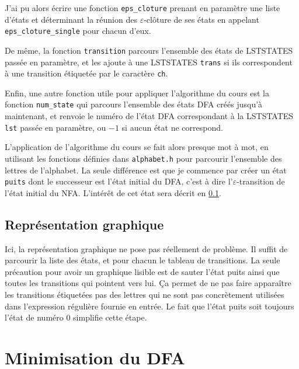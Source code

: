 \documentclass[12pt, a4paper]{article}
\begin{document}
J'ai pu alors écrire une fonction \texttt{eps\_cloture} prenant en paramètre une liste d'états et déterminant la réunion des $\varepsilon$-clôture de ses états en appelant \texttt{eps\_cloture\_single} pour chacun d'eux.

De même, la fonction \texttt{transition} parcours l'ensemble des états de LSTSTATES passée en paramètre, et les ajoute à une LSTSTATES \texttt{trans} si ils correspondent à une transition étiquetée par le caractère \texttt{ch}.

Enfin, une autre fonction utile pour appliquer l'algorithme du cours est la fonction \texttt{num\_state} qui parcours l'ensemble des états DFA créés jusqu'à maintenant, et renvoie le numéro de l'état DFA correspondant à la LSTSTATES \texttt{lst} passée en paramètre, ou $-1$ si aucun état ne correspond. 

L'application de l'algorithme du cours se fait alors presque mot à mot, en utilisant les fonctions définies dans \texttt{alphabet.h} pour parcourir l'ensemble des lettres de l'alphabet. La seule différence est que je commence par créer un état \texttt{puits} dont le successeur est l'état initial du DFA, c'est à dire l'$\varepsilon$-transition de l'état initial du NFA. L'intérêt de cet état sera décrit en \ref{dfa_graph}.


\subsection{Représentation graphique}
\label{dfa_graph}

Ici, la représentation graphique ne pose pas réellement de problème. Il suffit de parcourir la liste des états, et pour chacun le tableau de transitions. La seule précaution pour avoir un graphique lisible est de sauter l'état puits ainsi que toutes les transitions qui pointent vers lui. Ça permet de ne pas faire apparaître les transitions étiquetées pas des lettres qui ne sont pas concrètement utilisées dans l'expression régulière fournie en entrée. Le fait que l'état puits soit toujours l'état de numéro 0 simplifie cette étape.

\section{Minimisation du DFA}



\end{document}
